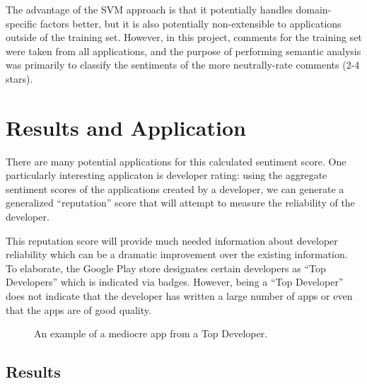 \documentclass{acm_proc_article-sp}
\begin{document}
The advantage of the SVM approach is that it potentially handles domain-specific factors better, but it is also potentially non-extensible to applications outside of the training set.  However, in this project, comments for the training set were taken from all applications, and the purpose of performing semantic analysis was primarily to classify the sentiments of the more neutrally-rate comments (2-4 stars).

\section{Results and Application}
There are many potential applications for this calculated sentiment score. One particularly interesting applicaton is developer rating: using the aggregate sentiment scores of the applications created by a developer, we can generate a generalized ``reputation'' score that will attempt to measure the reliability of the developer.

 This reputation score will provide much needed information about developer reliability which can be a dramatic improvement over the existing information. To elaborate, the Google Play store designates certain developers as ``Top Developers'' which is indicated via badges. However, being a ``Top Developer'' does not indicate that the developer has written a large number of apps or even that the apps are of good quality.
\pagebreak
\begin{figure}[!h]
\centering
{}
\caption{An example of a mediocre app from a Top Developer.}
\label{fig:myfig}
\end{figure} 

\subsection{Results}
\end{document}
